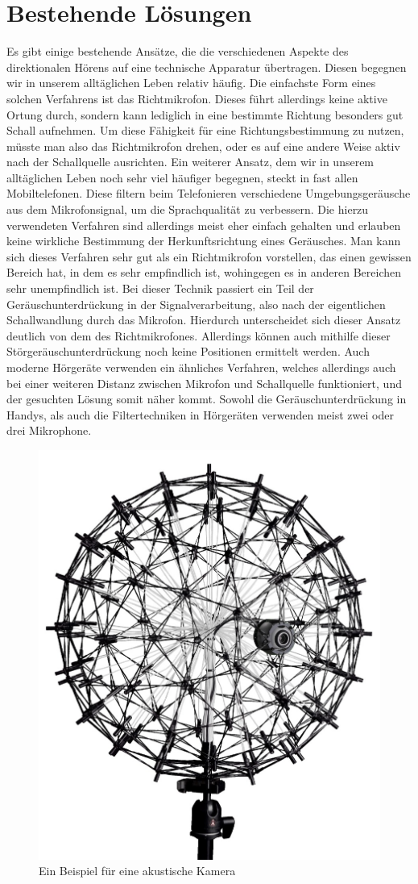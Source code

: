 \section{Bestehende Lösungen}
  Es gibt einige bestehende Ansätze, die die verschiedenen Aspekte des direktionalen Hörens auf eine technische Apparatur übertragen. Diesen begegnen wir in unserem alltäglichen Leben relativ häufig. Die einfachste Form eines solchen Verfahrens ist das Richtmikrofon. Dieses führt allerdings keine aktive Ortung durch, sondern kann lediglich in eine bestimmte Richtung besonders gut Schall aufnehmen. Um diese Fähigkeit für eine Richtungsbestimmung zu nutzen, müsste man also das Richtmikrofon drehen, oder es auf eine andere Weise aktiv nach der Schallquelle ausrichten. Ein weiterer Ansatz, dem wir in unserem alltäglichen Leben noch sehr viel häufiger begegnen, steckt in fast allen Mobiltelefonen. Diese filtern beim Telefonieren verschiedene Umgebungsgeräusche aus dem Mikrofonsignal, um die Sprachqualität zu verbessern. Die hierzu verwendeten Verfahren sind allerdings meist eher einfach gehalten und erlauben keine wirkliche Bestimmung der Herkunftsrichtung eines Geräusches. Man kann sich dieses Verfahren sehr gut als ein Richtmikrofon vorstellen, das einen gewissen Bereich hat, in dem es sehr empfindlich ist, wohingegen es in anderen Bereichen sehr unempfindlich ist. Bei dieser Technik passiert ein Teil der Geräuschunterdrückung in der Signalverarbeitung, also nach der eigentlichen Schallwandlung durch das Mikrofon. Hierdurch unterscheidet sich dieser Ansatz deutlich von dem des Richtmikrofones. Allerdings können auch mithilfe dieser Störgeräuschunterdrückung noch keine Positionen ermittelt werden. Auch moderne Hörgeräte verwenden ein ähnliches Verfahren, welches allerdings auch bei einer weiteren Distanz zwischen Mikrofon und Schallquelle funktioniert, und der gesuchten Lösung somit näher kommt. Sowohl die Geräuschunterdrückung in Handys, als auch die Filtertechniken in Hörgeräten verwenden meist zwei oder drei Mikrophone.\\
     \begin{figure}
     	\centering
     	\includegraphics[width=0.4\linewidth]{img/akusticCamera}
     	\caption{Ein Beispiel für eine akustische Kamera \cite{camera}}
     	\label{fig:camera}
     \end{figure}
